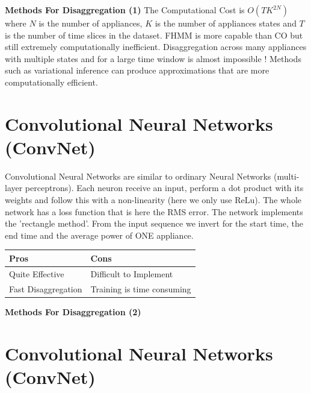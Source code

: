 \documentclass[landscape,fontscale=0.48,margin=2cm,paperwidth=135truecm,paperheight=89truecm]{baposter}
\begin{document}
\begin{poster}
\begin{posterbox}[column=1, height = bottom]{\LARGE \bfseries Methods For Disaggregation (1)}
\vspace{6pt}
The Computational Cost is $O(TK^{2N})$ where $N$ is the number of appliances, $K$ is the number of appliances states and $T$ is the number of time slices in the dataset. FHMM is more capable than CO but still extremely computationally inefficient. Disaggregation across many appliances with multiple states and for a large time window is almost impossible ! Methods such as variational inference can produce approximations that are more computationally efficient. 


\section*{Convolutional Neural Networks (ConvNet)}

Convolutional Neural Networks are similar to ordinary Neural Networks (multi-layer perceptrons). Each neuron receive an input, perform a dot product with its weights and follow this with a non-linearity (here we only use ReLu). The whole network has a loss function that is here the RMS error. The network implements the 'rectangle method'. From the input sequence we invert for the start time, the end time and the average power of ONE appliance.

\vspace{1em}
\begin{tabularx}{\linewidth}{X|X}
  \hline
  \bf Pros & \bf Cons \\
  \hline
  \small Quite Effective & \small Difficult to Implement\\
  \small Fast Disaggregation & \small Training is time consuming\\
  \hline
\end{tabularx}
\end{posterbox}

%
\begin{posterbox}[column=2]{\LARGE \bfseries Methods For Disaggregation (2)}
\section*{Convolutional Neural Networks (ConvNet)}

%




\end{posterbox}
\end{poster}
\end{document}
